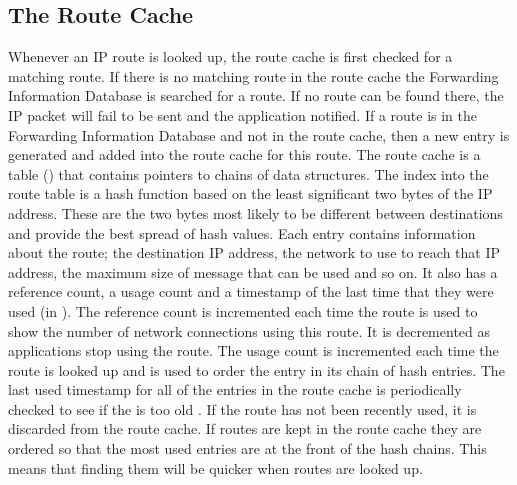 \subsection{The Route Cache}
Whenever an IP route is looked up, the route cache is first checked for a matching route.
If there is no matching route in the route cache the Forwarding Information Database is
searched for a route.
If no route can be found there, the IP packet will fail to be sent and the application notified.
If a route is in the Forwarding Information Database and not in the route cache, then a new 
entry is generated and added into the route cache for this route.
The route cache is a table ()
that contains pointers to chains of  data structures.
The index into the route table is a hash function based on the least significant two bytes
of the IP address.
These are the two bytes most likely to be different between destinations and provide the best
spread of hash values.
Each  entry contains information about the route; the destination IP address, the
network  to use to reach that IP address, the maximum size of message that can
be used and so on.
It also has a reference count, a usage count and a timestamp of the last time that they were
used (in ).
The reference count is incremented each time the route is used to show the
number of network connections using this route.
It is decremented as applications stop using the route.
The usage count is incremented each time the route is looked up and 
is used to order the  entry in its chain of hash entries.
The last used timestamp for all of the entries in the route cache is periodically checked to see 
if the  is too old
.
If the route has not been recently used, it is discarded from the route cache.
If routes are kept in the route cache they are ordered so that the most used entries are at 
the front of the hash chains.
This means that finding them will be quicker when routes are looked up.


